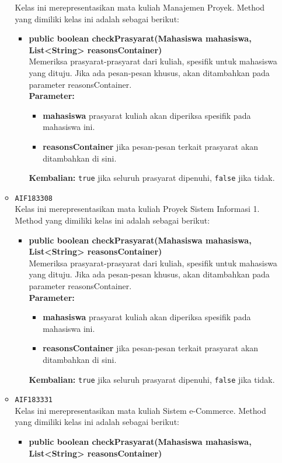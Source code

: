 \begin{enumerate}
\begin{itemize}
Kelas ini merepresentasikan mata kuliah Manajemen Proyek. Method yang dimiliki kelas ini adalah sebagai berikut: 
\begin{itemize}
\item \textbf{public boolean checkPrasyarat(Mahasiswa mahasiswa, List<String> reasonsContainer)}\\
Memeriksa prasyarat-prasyarat dari kuliah, spesifik untuk mahasiswa yang dituju. Jika ada pesan-pesan khusus, akan ditambahkan pada parameter reasonsContainer.\\
\textbf{Parameter:}
\begin{itemize}
\item \textbf{mahasiswa} prasyarat kuliah akan diperiksa spesifik pada mahasiswa ini.
\item \textbf{reasonsContainer} jika pesan-pesan terkait prasyarat akan ditambahkan di sini.
\end{itemize}
\textbf{Kembalian:} \texttt{true} jika seluruh prasyarat dipenuhi, \texttt{false} jika tidak.
\end{itemize}
\item \texttt{AIF183308} \\
Kelas ini merepresentasikan mata kuliah Proyek Sistem Informasi 1. Method yang dimiliki kelas ini adalah sebagai berikut: 
\begin{itemize}
\item \textbf{public boolean checkPrasyarat(Mahasiswa mahasiswa, List<String> reasonsContainer)}\\
Memeriksa prasyarat-prasyarat dari kuliah, spesifik untuk mahasiswa yang dituju. Jika ada pesan-pesan khusus, akan ditambahkan pada parameter reasonsContainer.\\
\textbf{Parameter:}
\begin{itemize}
\item \textbf{mahasiswa} prasyarat kuliah akan diperiksa spesifik pada mahasiswa ini.
\item \textbf{reasonsContainer} jika pesan-pesan terkait prasyarat akan ditambahkan di sini.
\end{itemize}
\textbf{Kembalian:} \texttt{true} jika seluruh prasyarat dipenuhi, \texttt{false} jika tidak.
\end{itemize}
\item \texttt{AIF183331} \\
Kelas ini merepresentasikan mata kuliah Sistem e-Commerce. Method yang dimiliki kelas ini adalah sebagai berikut: 
\begin{itemize}
\item \textbf{public boolean checkPrasyarat(Mahasiswa mahasiswa, List<String> reasonsContainer)}\\

\end{itemize}
\end{itemize}
\end{enumerate}
